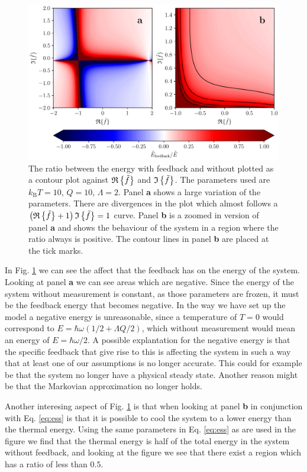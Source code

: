 \begin{figure}[t]
    \centering
    \includegraphics[width=\textwidth]{figures/energyFeedbackRatio.pdf}
    \caption{\small The ratio between the energy with feedback and without plotted as a contour plot against $\mathfrak{R}\left\{\tilde{f}\right\}$ and $\mathfrak{I}\left\{\tilde{f}\right\}$. The parameters used are $k_\text{B}T = 10$, $Q = 10$, $\Lambda = 2$. Panel \textbf{a} shows a large variation of the parameters. There are divergences in the plot which almost follows a $\left(\mathfrak{R}\left\{\tilde{f}\right\} + 1 \right)\mathfrak{I}\left\{\tilde{f}\right\} = 1$ curve. Panel \textbf{b} is a zoomed in version of panel \textbf{a} and shows the behaviour of the system in a region where the ratio always is positive. The contour lines in panel \textbf{b} are placed at the tick marks.}
    \label{fig:energyFeedbackRatio}
\end{figure}
In Fig. \ref{fig:energyFeedbackRatio} we can see the affect that the feedback has on the energy of the system. Looking at panel \textbf{a} we can see areas which are negative. Since the energy of the system without measurement is constant, as those parameters are frozen, it must be the feedback energy that becomes negative. In the way we have set up the model a negative energy is unreasonable, since a temperature of $T=0$ would correspond to $E =\hbar\omega( 1/2 + \Lambda Q/2)$, which without measurement would mean an energy of $E = \hbar\omega/2$. A possible explantation for the negative energy is that the specific feedback that give rise to this is affecting the system in such a way that at least one of our assumptions is no longer accurate. This could for example be that the system no longer have a physical steady state. Another reason might be that the Markovian approximation no longer holds.

Another interesing aspect of Fig. \ref{fig:energyFeedbackRatio} is that when looking at panel \textbf{b} in conjunction with Eq. \eqref{eq:ess} is that it is possible to cool the system to a lower energy than the thermal energy. Using the same parameters in Eq. \eqref{eq:ess} as are used in the figure we find that the thermal energy is half of the total energy in the system without feedback, and looking at the figure we see that there exist a region which has a ratio of less than $0.5$.


